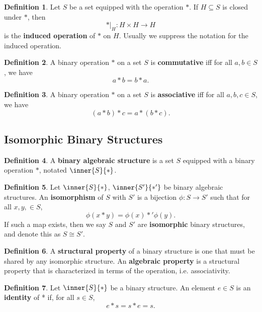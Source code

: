 \documentclass[a5paper]{article}
\theoremstyle{definition}%
\newtheorem*{definition*}{Definition}
\numberwithin{exercise}{section}
\theoremstyle{remark}%
\begin{document}
\begin{definition*}
Let $S$ be a set equipped with the operation $*$. If $H\subseteq S$ is closed under $*$, then 
$$*|_H:H\times H\to H$$
is the \textbf{induced operation} of $*$ on $H$. Usually we suppress the notation for the induced operation. 
\end{definition*}


\begin{definition*}
A binary operation $*$ on a set $S$ is \textbf{commutative} iff for all $a,b\in S$, we have
$$a*b=b*a.$$
\end{definition*}

\begin{definition*}
A binary operation $*$ on a set $S$ is \textbf{associative} iff for all $a,b,c\in S$, we have
$$(a*b)*c=a*(b*c).$$
\end{definition*}

\subsection{Isomorphic Binary Structures}
\begin{definition*}
A \textbf{binary algebraic structure} is a set $S$ equipped with a binary operation $*$, notated $\inner{S}{*}$. 
\end{definition*}

\begin{highlight}
\begin{definition*}
Let $\inner{S}{*}$, $\inner{S'}{*'}$ be binary algebraic structures. An \textbf{isomorphism} of $S$ with $S'$ is a bijection $\phi:S\to S'$ such that for all $x,y,\in S$, 
$$\phi(x*y)=\phi(x)*'\phi(y).$$
If such a map exists, then we say $S$ and $S'$ are \textbf{isomorphic} binary structures, and denote this as $S\cong S'$. 
\end{definition*}
\end{highlight}

\begin{definition*}
A \textbf{structural property} of a binary structure is one that must be shared by any isomorphic structure. An \textbf{algebraic property} is a structural property that is characterized in terms of the operation, i.e. associativity. 
\end{definition*}

\begin{highlight}
\begin{definition*}
Let $\inner{S}{*}$ be a binary structure. An element $e\in S$ is an \textbf{identity} of * if, for all $s\in S$, 
$$e*s=s*e=s.$$
\end{definition*}
\end{highlight}
\end{document}
